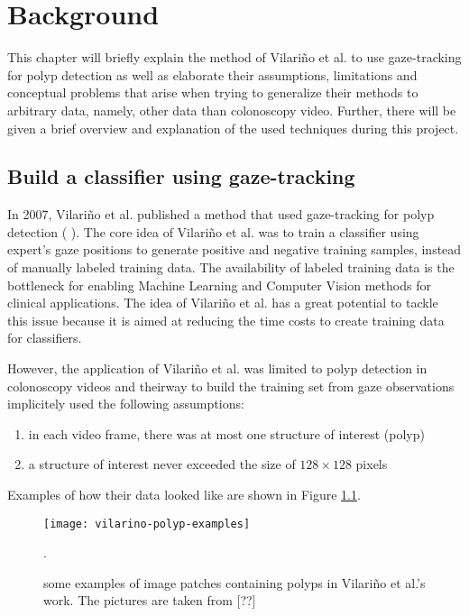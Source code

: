 \chapter{Background}
\label{chap:background}
This chapter will briefly explain the method of Vilari\~no et al. to use gaze-tracking for polyp detection as well as elaborate their assumptions, limitations and conceptual problems that arise when trying to generalize their methods to arbitrary data, namely, other data than colonoscopy video. Further, there will be given a brief overview and explanation of the used techniques during this project.


\section{Build a classifier using gaze-tracking}
In 2007, Vilari\~no et al. published a method that used gaze-tracking for polyp detection ( ). The core idea of Vilari\~no et al. was to train a classifier using expert's gaze positions to generate positive and negative training samples, instead of manually labeled training data. 
The availability of labeled training data is the bottleneck for enabling Machine Learning and Computer Vision methods for clinical applications. 
The idea of Vilari\~no et al. has a great potential to tackle this issue because it is aimed at reducing the time costs to create training data for classifiers. 

However, the application of Vilari\~no et al. was limited to polyp detection in colonoscopy videos and theirway to build the training set from gaze observations implicitely used the following assumptions:
\begin{enumerate}
 \item in each video frame, there was at most one structure of interest (polyp)
 \item a structure of interest never exceeded the size of $128 \times 128$ pixels
\end{enumerate}
Examples of how their data looked like are shown in Figure \ref{fig:vilarinoPolypExamples}.

\begin{figure}[ht]
	\centering
	\texttt{[image: vilarino-polyp-examples]}
	\caption{some examples of image patches containing polyps in Vilari\~no et al.'s work. The pictures are taken from [??]}.
	\label{fig:vilarinoPolypExamples}
\end{figure}

